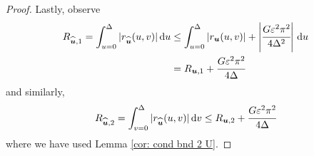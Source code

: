 \begin{proof}
	Lastly, observe 
	\begin{align*}
		R_{\widehat{\boldsymbol u},1} = \int_{u=0}^\Delta |r_{\widehat{\boldsymbol u}} (u,v) |\, \mathrm{d} u 
		&\leq \int_{u=0}^\Delta \left|r_{\boldsymbol u} (u,v) \right| + \left|\cfrac{G \varepsilon^2 \pi^2}{4\Delta^2}\right| \, \mathrm{d} u
		\\& = R_{{{\boldsymbol u}},1} + \cfrac{G \varepsilon^2 \pi^2}{4\Delta}
	\end{align*}
	and similarly, 
	\[R_{\widehat{\boldsymbol u},2} = \int_{v=0}^\Delta |r_{\widehat{\boldsymbol u}} (u,v) |\, \mathrm{d} v \leq R_{{\boldsymbol u},2} + \cfrac{G \varepsilon^2 \pi^2}{4\Delta}\]
	where we have used Lemma \ref{cor: cond bnd 2 U}. 
\end{proof}
